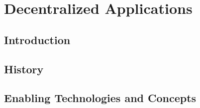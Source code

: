 \section{Decentralized Applications}\label{sec::decentralizedapps}

\subsection{Introduction}

\subsection{History}

\subsection{Enabling Technologies and Concepts}